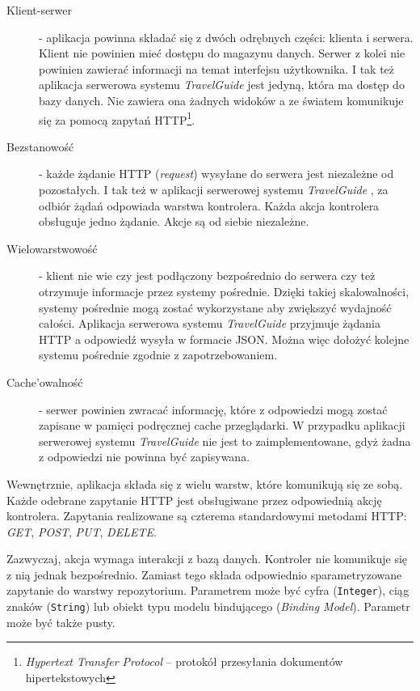\documentclass{book}
\newcommand{\appName}{\emph{TravelGuide} }
\begin{document}
			\begin{description}
				
				\item[Klient-serwer] - aplikacja powinna składać się z dwóch odrębnych części: klienta i serwera. Klient nie powinien mieć dostępu do magazynu danych. Serwer z kolei nie powinien zawierać informacji na temat interfejsu użytkownika. I tak też aplikacja serwerowa systemu \appName jest jedyną, która ma dostęp do bazy danych. Nie zawiera ona żadnych widoków a ze światem %
				komunikuje się za pomocą zapytań HTTP\footnote{\emph{Hypertext Transfer Protocol} – protokół przesyłania dokumentów hipertekstowych}.
				\item[Bezstanowość] - każde żądanie HTTP (\emph{request}) wysyłane do serwera jest niezależne od pozostałych. I tak też w aplikacji serwerowej systemu \appName, za odbiór żądań odpowiada warstwa kontrolera. Każda akcja kontrolera obsługuje jedno żądanie. Akcje są od siebie niezależne.
				\item[Wielowarstwowość] - klient nie wie czy jest podłączony bezpośrednio do serwera czy też otrzymuje informacje przez systemy pośrednie. Dzięki takiej skalowalności, systemy pośrednie mogą zostać wykorzystane aby zwiększyć wydajność całości. Aplikacja serwerowa systemu \appName przyjmuje żądania HTTP a odpowiedź wysyła w formacie JSON. Można więc dołożyć kolejne systemu pośrednie zgodnie z zapotrzebowaniem. 
				\item[Cache'owalność] - %
				serwer powinien zwracać informację, które z odpowiedzi mogą zostać zapisane w pamięci podręcznej cache przeglądarki. W przypadku aplikacji serwerowej systemu \appName nie jest to zaimplementowane, gdyż żadna z odpowiedzi nie powinna być zapisywana.
				
			\end{description}
			
			Wewnętrznie, aplikacja składa się z wielu warstw, które komunikują się ze sobą. Każde odebrane zapytanie HTTP jest obsługiwane przez odpowiednią akcję kontrolera. Zapytania realizowane są czterema standardowymi metodami HTTP: \emph{GET}, \emph{POST}, \emph{PUT}, \emph{DELETE}.
			
			Zazwyczaj, akcja wymaga interakcji z bazą danych. Kontroler nie komunikuje się z nią jednak bezpośrednio. Zamiast tego składa odpowiednio sparametryzowane zapytanie do warstwy repozytorium. Parametrem może być cyfra (\texttt{Integer}), ciąg znaków (\texttt{String}) lub obiekt typu modelu bindującego (\emph{Binding Model}). Parametr może być także pusty. 
			
\end{document}
